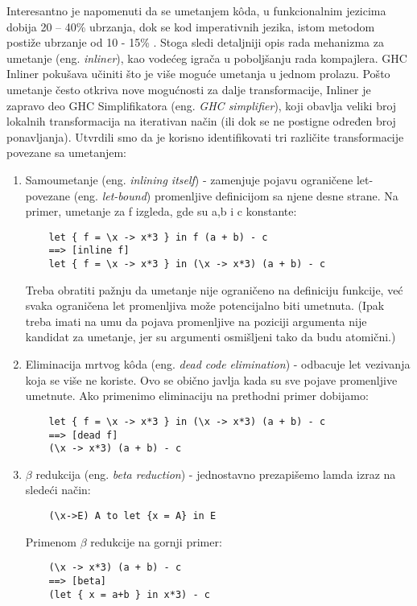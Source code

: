 Interesantno je napomenuti da se umetanjem k\^{o}da, u funkcionalnim jezicima dobija 20 – 40\% ubrzanja, dok se kod imperativnih jezika, istom metodom postiže ubrzanje od 10 - 15\% \cite{Cinliner}. Stoga sledi detaljniji opis rada mehanizma za umetanje (eng. \emph{inliner}), kao vodećeg igrača u poboljšanju rada kompajlera. GHC Inliner pokušava učiniti što je više moguće umetanja u jednom prolazu. Pošto umetanje često otkriva nove mogućnosti za dalje transformacije, Inliner je zapravo deo GHC Simplifikatora (eng. \emph{GHC simplifier}), koji obavlja veliki broj lokalnih transformacija na iterativan način (ili dok se ne postigne određen broj ponavljanja).
Utvrdili smo da je korisno identifikovati tri različite transformacije povezane sa umetanjem:
\begin{enumerate}
	\item  Samoumetanje (eng. \emph{inlining itself}) - zamenjuje pojavu ograničene let-povezane (eng. \emph{let-bound}) promenljive definicijom sa njene desne strane. Na primer, umetanje za f izgleda, gde su a,b i c konstante: 
	\begin{verbatim}
	let { f = \x -> x*3 } in f (a + b) - c
	==> [inline f]
	let { f = \x -> x*3 } in (\x -> x*3) (a + b) - c
	\end{verbatim}
	Treba obratiti pažnju da umetanje nije ograničeno na definiciju funkcije, već svaka ograničena let promenljiva može potencijalno biti umetnuta. (Ipak treba imati na umu da pojava promenljive na poziciji argumenta nije kandidat za umetanje, jer su argumenti osmišljeni tako da budu atomični.)
	\item Eliminacija mrtvog k\^{o}da (eng. \emph{dead code elimination}) - odbacuje let vezivanja koja se više ne koriste. Ovo se obično javlja 	kada su sve pojave promenljive umetnute. Ako primenimo eliminaciju na prethodni primer dobijamo:
	\begin{verbatim}
	let { f = \x -> x*3 } in (\x -> x*3) (a + b) - c
	==> [dead f]
	(\x -> x*3) (a + b) - c
	\end{verbatim}
	\item $\beta$  redukcija (eng. \emph{beta reduction}) - jednostavno prezapišemo lamda izraz na sledeći način:
	\begin{verbatim}
	(\x->E) A to let {x = A} in E 
	\end{verbatim} Primenom $\beta$ redukcije na gornji primer:
	\begin{verbatim}
	(\x -> x*3) (a + b) - c
	==> [beta]
	(let { x = a+b } in x*3) - c
	\end{verbatim}
\end{enumerate}

